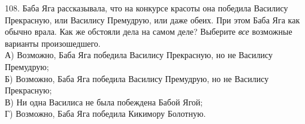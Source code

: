 108. Баба Яга рассказывала, что на конкурсе красоты она победила Василису Прекрасную, или Василису Премудрую, или даже обеих. При этом Баба Яга как обычно врала. Как же обстояли дела на самом деле? Выберите {\it все} возможные варианты произошедшего.\\
А) Возможно, Баба Яга победила Василису Прекрасную, но не Василису Премудрую;\\
Б) Возможно, Баба Яга победила Василису Премудрую, но не Василису Прекрасную;\\
В) Ни одна Василиса не была побеждена Бабой Ягой;\\
Г) Возможно, Баба Яга победила Кикимору Болотную.\\
